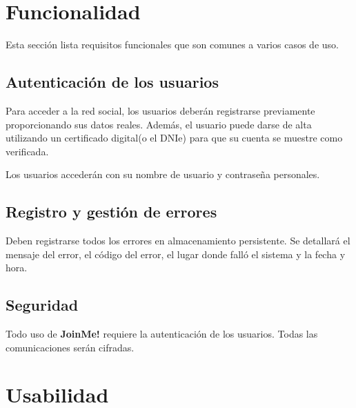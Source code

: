 \documentclass[12pt, a4paper, titlepage]{article}
\begin{document}
\section{Funcionalidad}

Esta sección lista requisitos funcionales que son comunes a varios casos de uso.

\subsection{Autenticación de los usuarios}

Para acceder a la red social, los usuarios deberán registrarse previamente proporcionando sus datos reales. Además, el usuario puede darse de alta utilizando un certificado digital(o el DNIe) para que su cuenta se muestre como verificada.

Los usuarios accederán con su nombre de usuario y contraseña personales.

\subsection{Registro y gestión de errores}

Deben registrarse todos los errores en almacenamiento persistente. Se detallará el mensaje del error, el código del error, el lugar donde falló el sistema y la fecha y hora.

\subsection{Seguridad}

Todo uso de \textbf{JoinMe!} requiere la autenticación de los usuarios. Todas las comunicaciones serán cifradas.

\section{Usabilidad}
\end{document}
